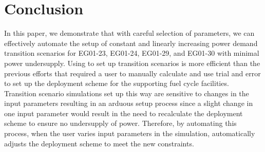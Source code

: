 \section{Conclusion}
In this paper, we demonstrate that with careful selection of 
\deploy parameters, we can 
effectively automate the setup of constant and 
linearly increasing power demand transition scenarios
for EG01-23, EG01-24, EG01-29, and EG01-30 with minimal 
power undersupply. 
Using \deploy to set up transition scenarios 
is more efficient than the previous efforts that
required a user to manually calculate and use trial and error 
to set up the deployment scheme for the supporting fuel cycle 
facilities. 
Transition scenario simulations set up this way are sensitive 
to changes in the input parameters resulting in an 
arduous setup process since a slight change in one 
input parameter would result in the need to recalculate 
the deployment scheme to ensure no undersupply 
of power.   
Therefore, by automating this process, when the user varies input parameters 
in the simulation, \deploy automatically adjusts the
deployment scheme to meet the new constraints. 